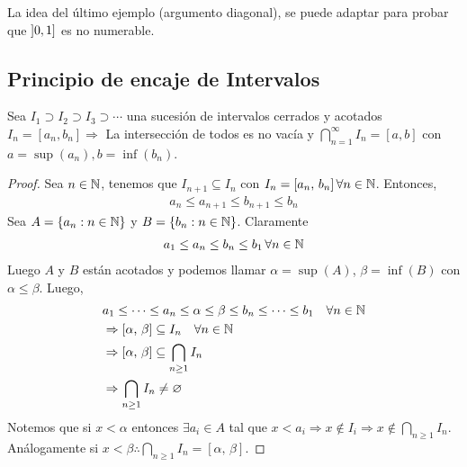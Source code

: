 La idea del último ejemplo (argumento diagonal), se puede adaptar para probar que \( \interval[open left]{0}{1} \) es no numerable.

\subsection{Principio de encaje de Intervalos}

\begin{theorem}
    Sea \(I_1 \supset I_2 \supset I_3 \supset \cdots \) una sucesión de intervalos cerrados y acotados \(I_n = [a_n, b_n] \Rightarrow \)
    La intersección de todos es no vacía y \(\bigcap_{n=1}^{\infty} I_n = [a,b]\) con \(a = \sup(a_n), b=\inf(b_n)\).
    \begin{proof}
        Sea \(n \in \mathbb{N} \), tenemos que \(I_{n+1} \subseteq I_n\) con \(I_n = [a_n\text{, } b_n] \, \forall n \in \mathbb{N} \). Entonces, \begin{align*}
            a_n \leq a_{n+1} \leq b_{n+1} \leq b_n
        \end{align*}
        Sea \(A = \{ a_n : n \in \mathbb{N} \} \) y \(B = \{ b_n : n \in \mathbb{N} \} \). Claramente \begin{align*}
            a_1 \leq a_n \leq b_n \leq b_1 \, \forall n \in \mathbb{N}
        \end{align*}
        Luego \(A\) y \(B\) están acotados y podemos llamar \(\alpha = \sup(A)\), \(\beta = \inf(B)\) con \(\alpha \leq \beta \). Luego, \begin{align*}
             & a_1 \leq \cdots \leq a_n \leq \alpha \leq \beta \leq b_n \leq \cdots \leq b_1 \quad \forall n \in \mathbb{N} \\
             & \Rightarrow [\alpha\text{, }\beta] \subseteq I_n \quad \forall n \in \mathbb{N}                              \\
             & \Rightarrow [\alpha\text{, }\beta] \subseteq \bigcap_{n \geq 1} I_n                                  \\
             & \Rightarrow \bigcap_{n \geq 1} I_n \neq \varnothing
        \end{align*}
        Notemos que si \(x < \alpha \) entonces \(\exists a_i \in A\) tal que \(x < a_i \Rightarrow x \notin I_i \Rightarrow x \notin \bigcap_{n \geq 1} I_n\).
        Análogamente si \(x < \beta \therefore \bigcap_{n \geq 1} I_n = [\alpha\text{, }\beta]\).
    \end{proof}
\end{theorem}

